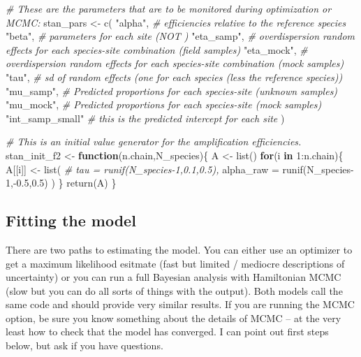 \documentclass[
]{article}
\newenvironment{Shaded}{\begin{snugshade}}{\end{snugshade}}
\newcommand{\AttributeTok}[1]{\textcolor[rgb]{0.77,0.63,0.00}{#1}}
\newcommand{\CommentTok}[1]{\textcolor[rgb]{0.56,0.35,0.01}{\textit{#1}}}
\newcommand{\ControlFlowTok}[1]{\textcolor[rgb]{0.13,0.29,0.53}{\textbf{#1}}}
\newcommand{\DecValTok}[1]{\textcolor[rgb]{0.00,0.00,0.81}{#1}}
\newcommand{\FloatTok}[1]{\textcolor[rgb]{0.00,0.00,0.81}{#1}}
\newcommand{\FunctionTok}[1]{\textcolor[rgb]{0.00,0.00,0.00}{#1}}
\newcommand{\NormalTok}[1]{#1}
\newcommand{\OtherTok}[1]{\textcolor[rgb]{0.56,0.35,0.01}{#1}}
\newcommand{\SpecialCharTok}[1]{\textcolor[rgb]{0.00,0.00,0.00}{#1}}
\newcommand{\StringTok}[1]{\textcolor[rgb]{0.31,0.60,0.02}{#1}}
\begin{document}
\begin{Shaded}
\begin{Highlighting}[]
\CommentTok{\# These are the parameters that are to be monitored during optimization or MCMC:}
\NormalTok{stan\_pars }\OtherTok{\textless{}{-}} \FunctionTok{c}\NormalTok{(}
  \StringTok{"alpha"}\NormalTok{, }\CommentTok{\# efficiencies relative to the reference species}
  \StringTok{"beta"}\NormalTok{,  }\CommentTok{\# parameters for each site (NOT )}
  \StringTok{"eta\_samp"}\NormalTok{, }\CommentTok{\# overdispersion random effects for each species{-}site combination (field samples)}
  \StringTok{"eta\_mock"}\NormalTok{, }\CommentTok{\# overdispersion random effects for each species{-}site combination (mock samples)}
  \StringTok{"tau"}\NormalTok{, }\CommentTok{\# sd of random effects (one for each species (less the reference species))}
  \StringTok{"mu\_samp"}\NormalTok{, }\CommentTok{\# Predicted proportions for each species{-}site (unknown samples)}
  \StringTok{"mu\_mock"}\NormalTok{, }\CommentTok{\# Predicted proportions for each species{-}site (mock samples)  }
  \StringTok{"int\_samp\_small"} \CommentTok{\# this is the predicted intercept for each site }
\NormalTok{)}

\CommentTok{\# This is an initial value generator for the amplification efficiencies.}
\NormalTok{stan\_init\_f2 }\OtherTok{\textless{}{-}} \ControlFlowTok{function}\NormalTok{(n.chain,N\_species)\{}
\NormalTok{  A }\OtherTok{\textless{}{-}} \FunctionTok{list}\NormalTok{()}
  \ControlFlowTok{for}\NormalTok{(i }\ControlFlowTok{in} \DecValTok{1}\SpecialCharTok{:}\NormalTok{n.chain)\{}
\NormalTok{    A[[i]] }\OtherTok{\textless{}{-}} \FunctionTok{list}\NormalTok{(}
      \CommentTok{\# tau = runif(N\_species{-}1,0.1,0.5),}
      \AttributeTok{alpha\_raw =} \FunctionTok{runif}\NormalTok{(N\_species}\DecValTok{{-}1}\NormalTok{,}\SpecialCharTok{{-}}\FloatTok{0.5}\NormalTok{,}\FloatTok{0.5}\NormalTok{)}
\NormalTok{    )}
\NormalTok{  \}}
  \FunctionTok{return}\NormalTok{(A)}
\NormalTok{\}}
\end{Highlighting}
\end{Shaded}

\hypertarget{fitting-the-model}{%
\subsection{Fitting the model}\label{fitting-the-model}}

There are two paths to estimating the model. You can either use an
optimizer to get a maximum likelihood esitmate (fast but limited /
mediocre descriptions of uncertainty) or you can run a full Bayesian
analysis with Hamiltonian MCMC (slow but you can do all sorts of things
with the output). Both models call the same code and should provide very
similar results. If you are running the MCMC option, be sure you know
something about the details of MCMC -- at the very least how to check
that the model has converged. I can point out first steps below, but ask
if you have questions.
\end{document}
